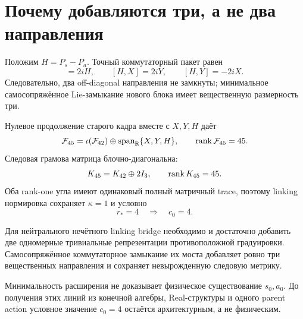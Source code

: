 \section{Почему добавляются три, а не два направления}

Положим $H=P_s-P_a$. Точный коммутаторный пакет равен
\begin{equation}
 [X,Y]=2iH,
 \qquad [H,X]=2iY,
 \qquad [H,Y]=-2iX.
 \label{eq:v8-baryon-c0-neutral-su2-closure}
\end{equation}
Следовательно, два off-diagonal направления не замкнуты; минимальное
самосопряжённое Lie-замыкание нового блока имеет вещественную размерность
три.

Нулевое продолжение старого кадра вместе с $X,Y,H$ даёт
\begin{equation}
 \mathcal F_{45}=\iota(\mathcal F_{42})\oplus
 \operatorname{span}_{\mathbb R}\{X,Y,H\},
 \qquad \operatorname{rank}\mathcal F_{45}=45.
 \label{eq:v8-baryon-c0-extended-frame-rank}
\end{equation}
Следовая грамова матрица блочно-диагональна:
\begin{equation}
 K_{45}=K_{42}\oplus2I_3,
 \qquad \operatorname{rank} K_{45}=45.
 \label{eq:v8-baryon-c0-extended-trace-metric}
\end{equation}
Оба rank-one угла имеют одинаковый полный матричный trace, поэтому linking
нормировка сохраняет $\kappa=1$ и условно
\begin{equation}
 r_*=4\quad\Longrightarrow\quad c_0=4.
 \label{eq:v8-baryon-c0-neutral-extension-conditional-c0}
\end{equation}

\begin{theorem}
Для нейтрального нечётного linking bridge необходимо и достаточно добавить
две одномерные тривиальные репрезентации противоположной градуировки.
Самосопряжённое коммутаторное замыкание их моста добавляет ровно три
вещественных направления и сохраняет невырожденную следовую метрику.
\end{theorem}

\begin{nogocriterion}
Минимальность расширения не доказывает физическое существование $s_0,a_0$.
До получения этих линий из конечной алгебры, Real-структуры и одного parent
action условное значение $c_0=4$ остаётся архитектурным, а не физическим.
\end{nogocriterion}

